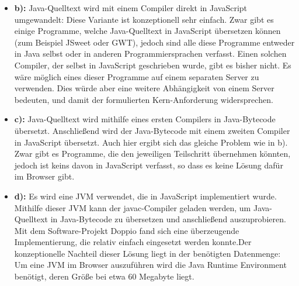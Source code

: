 \begin{itemize}
    \item \textbf{b):} Java-Quelltext wird mit einem Compiler direkt in JavaScript umgewandelt: Diese Variante ist konzeptionell sehr einfach. Zwar gibt es einige Programme, welche Java-Quelltext in JavaScript übersetzen können (zum Beispiel JSweet oder GWT), jedoch sind alle diese Programme entweder in Java selbst oder in anderen Programmiersprachen verfasst. Einen solchen Compiler, der selbst in JavaScript geschrieben wurde, gibt es bisher nicht. Es wäre möglich eines dieser Programme auf einem separaten Server zu verwenden. Dies würde aber eine weitere Abhängigkeit von einem Server bedeuten, und damit der formulierten Kern-Anforderung widersprechen.
    \item \textbf{c):} Java-Quelltext wird mithilfe eines ersten Compilers in Java-Bytecode übersetzt. Anschließend wird der Java-Bytecode mit einem zweiten Compiler in JavaScript übersetzt. Auch hier ergibt sich das gleiche Problem wie in b). Zwar gibt es Programme, die den jeweiligen Teilschritt übernehmen könnten, jedoch ist keins davon in JavaScript verfasst, so dass es keine Lösung dafür im Browser gibt.
    \item \textbf{d):} Es wird eine JVM verwendet, die in JavaScript implementiert wurde. Mithilfe dieser JVM kann der javac-Compiler geladen werden, um Java-Quelltext in Java-Bytecode zu übersetzen und anschließend auszuprobieren. Mit dem Software-Projekt Doppio fand sich eine überzeugende Implementierung, die relativ einfach eingesetzt werden konnte.Der konzeptionelle Nachteil dieser Lösung liegt in der benötigten Datenmenge: Um eine JVM im Browser auszuführen wird die Java Runtime Environment benötigt, deren Größe bei etwa 60 Megabyte liegt.
\end{itemize}